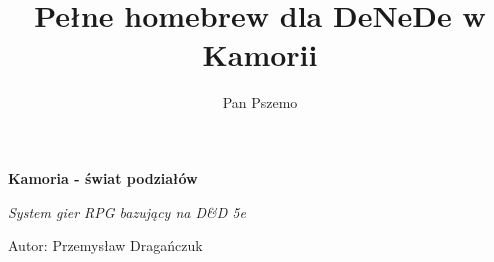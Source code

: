 \documentclass[a4paper,12pt]{scrbook}
\author{Pan Pszemo}
\title{Pełne homebrew dla DeNeDe w Kamorii}
\begin{document}

\begin{titlepage}
	\begin{center}
		\vspace*{1cm}

		{\LARGE\bfseries Kamoria - świat podziałów}

		\vspace{4cm}

		{\large\itshape System gier RPG bazujący na D\&D 5e}

		\vfill

		Autor: Przemysław Dragańczuk

		\vspace*{1cm}

	\end{center}
\end{titlepage}

\tableofcontents






\end{document}
